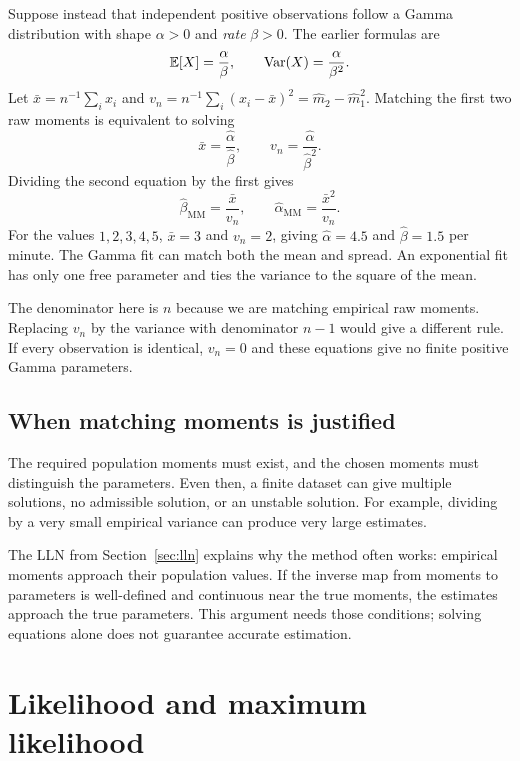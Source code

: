 Suppose instead that independent positive observations follow a Gamma
distribution with shape \(\alpha>0\) and \emph{rate} \(\beta>0\).
The earlier formulas are
\[
  \mathbb{E}[X]=\frac\alpha\beta,\qquad
  \operatorname{Var}(X)=\frac\alpha{\beta^2}.
\]
Let \(\bar x=n^{-1}\sum_i x_i\) and
\(v_n=n^{-1}\sum_i(x_i-\bar x)^2=\widehat m_2-\widehat m_1^2\).
Matching the first two raw moments is equivalent to solving
\[
  \bar x=\frac{\widehat\alpha}{\widehat\beta},\qquad
  v_n=\frac{\widehat\alpha}{\widehat\beta^2}.
\]
Dividing the second equation by the first gives
\begin{equation}
  \widehat\beta_{\mathrm{MM}}=\frac{\bar x}{v_n},\qquad
  \widehat\alpha_{\mathrm{MM}}=\frac{\bar x^2}{v_n}.
  \label{eq:gamma-moments-estimate}
\end{equation}
For the values \(1,2,3,4,5\), \(\bar x=3\) and \(v_n=2\), giving
\(\widehat\alpha=4.5\) and \(\widehat\beta=1.5\) per minute.
The Gamma fit can match both the mean and spread. An exponential fit has
only one free parameter and ties the variance to the square of the mean.

The denominator here is \(n\) because we are matching empirical raw
moments. Replacing \(v_n\) by the variance with denominator \(n-1\)
would give a different rule. If every observation is identical, \(v_n=0\)
and these equations give no finite positive Gamma parameters.

\subsection{When matching moments is justified}

The required population moments must exist, and the chosen moments must
distinguish the parameters. Even then, a finite dataset can give multiple
solutions, no admissible solution, or an unstable solution. For example,
dividing by a very small empirical variance can produce very large estimates.

The LLN from Section~\ref{sec:lln} explains why the method often works:
empirical moments approach their population values. If the inverse map from
moments to parameters is well-defined and continuous near the true moments,
the estimates approach the true parameters. This argument needs those
conditions; solving equations alone does not guarantee accurate estimation.

\section{Likelihood and maximum likelihood}
\label{sec:likelihood-estimation}

